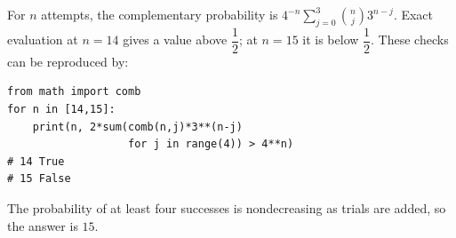 For $n$ attempts, the complementary probability is $4^{-n}\sum_{j=0}^3\binom nj3^{n-j}$. Exact evaluation at $n=14$ gives a value above $\dfrac{1}{2}$; at $n=15$ it is below $\dfrac{1}{2}$. These checks can be reproduced by:
\begin{verbatim}
from math import comb
for n in [14,15]:
    print(n, 2*sum(comb(n,j)*3**(n-j)
                   for j in range(4)) > 4**n)
# 14 True
# 15 False
\end{verbatim}
The probability of at least four successes is nondecreasing as trials are added, so the answer is $\boxed{15}$.
